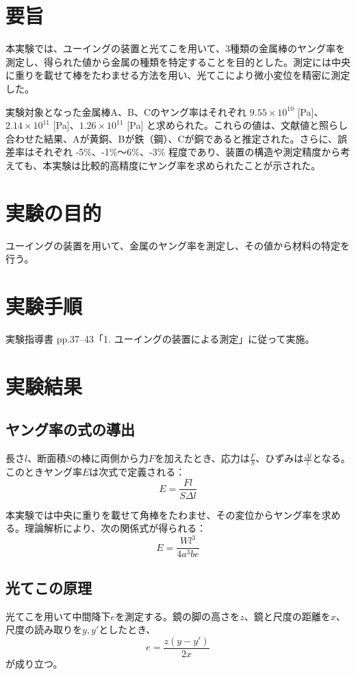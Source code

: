 \documentclass[a4paper,11pt,dvipdfmx]{jsarticle}
\begin{document}
\section{要旨}
本実験では、ユーイングの装置と光てこを用いて、3種類の金属棒のヤング率を測定し、得られた値から金属の種類を特定することを目的とした。測定には中央に重りを載せて棒をたわませる方法を用い、光てこにより微小変位を精密に測定した。

実験対象となった金属棒A、B、Cのヤング率はそれぞれ \(9.55 \times 10^{10}\) [Pa]、\(2.14 \times 10^{11}\) [Pa]、\(1.26 \times 10^{11}\) [Pa] と求められた。これらの値は、文献値と照らし合わせた結果、Aが黄銅、Bが鉄（鋼）、Cが銅であると推定された。さらに、誤差率はそれぞれ -5\%、-1\%〜6\%、-3\% 程度であり、装置の構造や測定精度から考えても、本実験は比較的高精度にヤング率を求められたことが示された。

\section{実験の目的}
ユーイングの装置を用いて、金属のヤング率を測定し、その値から材料の特定を行う。

\section{実験手順}
実験指導書 pp.37--43「1. ユーイングの装置による測定」に従って実施。

\section{実験結果}

\subsection{ヤング率の式の導出}
長さ\( l \)、断面積\( S \)の棒に両側から力\( F \)を加えたとき、応力は\( \frac{F}{S} \)、ひずみは\( \frac{\Delta l}{l} \)となる。
このときヤング率\( E \)は次式で定義される：
\begin{equation}
E = \frac{F l}{S \Delta l}
\end{equation}

本実験では中央に重りを載せて角棒をたわませ、その変位からヤング率を求める。理論解析により、次の関係式が得られる：
\begin{equation}
E = \frac{W l^3}{4 a^3 b e}
\end{equation}

\subsection{光てこの原理}
光てこを用いて中間降下\( e \)を測定する。鏡の脚の高さを\( z \)、鏡と尺度の距離を\( x \)、尺度の読み取りを\( y, y' \)としたとき、
\begin{equation}
e = \frac{z (y - y')}{2x}
\end{equation}
が成り立つ。
\end{document}
